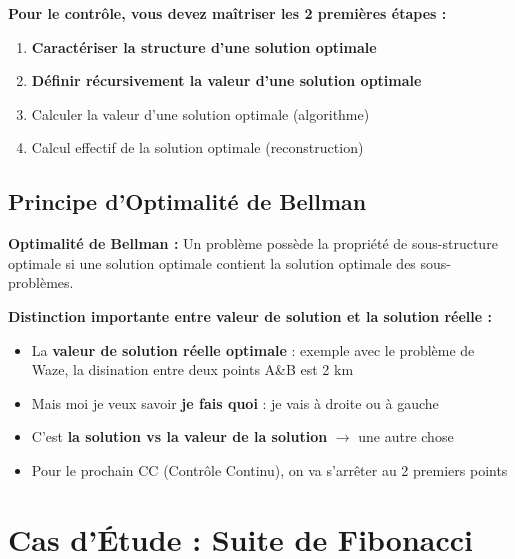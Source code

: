 \documentclass[12pt,a4paper]{article}
\begin{document}
\begin{important}
\textbf{Pour le contrôle, vous devez maîtriser les 2 premières étapes :}

\begin{enumerate}
    \item \textcolor{importantrouge}{\textbf{Caractériser la structure d'une solution optimale}}
    \item \textcolor{importantrouge}{\textbf{Définir récursivement la valeur d'une solution optimale}}
    \item Calculer la valeur d'une solution optimale (algorithme)
    \item Calcul effectif de la solution optimale (reconstruction)
\end{enumerate}
\end{important}

\subsection{Principe d'Optimalité de Bellman}

\begin{definition}
\textbf{Optimalité de Bellman :} Un problème possède la propriété de sous-structure optimale si une solution optimale contient la solution optimale des sous-problèmes.
\end{definition}

\begin{notecours}
\textbf{Distinction importante entre valeur de solution et la solution réelle :}
\begin{itemize}
    \item La \textbf{valeur de solution réelle optimale} : exemple avec le problème de Waze, la disination entre deux points A\&B est 2 km
    \item Mais moi je veux savoir \textbf{je fais quoi} : je vais à droite ou à gauche
    \item C'est \textbf{la solution vs la valeur de la solution} $\rightarrow$ une autre chose
    \item Pour le prochain CC (Contrôle Continu), on va s'arrêter au 2 premiers points
\end{itemize}
\end{notecours}

\newpage
\section{Cas d'Étude : Suite de Fibonacci}
\end{document}
